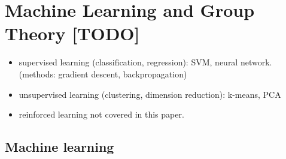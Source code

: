 \printbibliography
\appendix

\section{Machine Learning and Group Theory [TODO]}
\begin{itemize}
	\item supervised learning (classification, regression):
	SVM, neural network. (methods: gradient descent, backpropagation)

	\item unsupervised learning (clustering, dimension reduction): k-means, PCA

	\item reinforced learning not covered in this paper.
\end{itemize}

\subsection{Machine learning}

